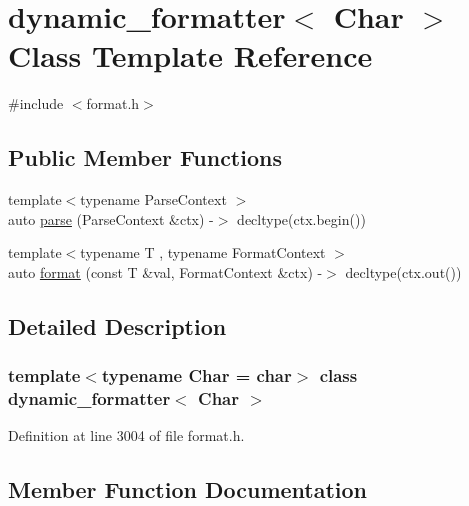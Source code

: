 \hypertarget{classdynamic__formatter}{}\section{dynamic\+\_\+formatter$<$ Char $>$ Class Template Reference}
\label{classdynamic__formatter}


{\ttfamily \#include $<$format.\+h$>$}

\subsection*{Public Member Functions}
\begin{DoxyCompactItemize}
\item 
{\footnotesize template$<$typename Parse\+Context $>$ }\\auto \hyperlink{classdynamic__formatter_aa9bc96ae30462d4e5f13d207f957fc0b}{parse} (Parse\+Context \&ctx) -\/$>$ decltype(ctx.\+begin())
\item 
{\footnotesize template$<$typename T , typename Format\+Context $>$ }\\auto \hyperlink{classdynamic__formatter_ad409c112b5d8058d65e3b96d20c4a524}{format} (const T \&val, Format\+Context \&ctx) -\/$>$ decltype(ctx.\+out())
\end{DoxyCompactItemize}


\subsection{Detailed Description}
\subsubsection*{template$<$typename Char = char$>$\newline
class dynamic\+\_\+formatter$<$ Char $>$}



Definition at line 3004 of file format.\+h.



\subsection{Member Function Documentation}
\mbox{\label{classdynamic__formatter_ad409c112b5d8058d65e3b96d20c4a524}} 
